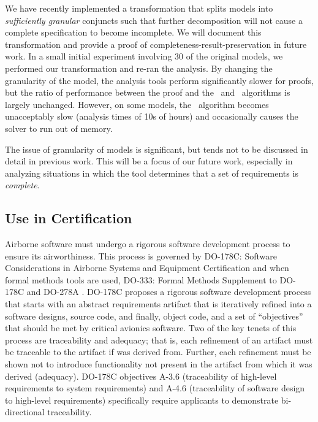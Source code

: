 %
We have recently implemented a transformation that splits models into {\em sufficiently granular} conjuncts such that further decomposition will not cause a complete specification to become incomplete.  We will document this transformation and provide a proof of completeness-result-preservation in future work.
%
In a small initial experiment involving 30 of the original models, we performed our transformation and re-ran the analysis.  By changing the granularity of the model, the analysis tools perform significantly slower for proofs, but the ratio of performance between the proof and the \ucalg\ and \mustalg\ algorithms is largely unchanged.  However, on some models, the \mustalg\ algorithm becomes unacceptably slow (analysis times of 10s of hours) and occasionally causes the solver to run out of memory.

The issue of granularity of models is significant, but tends not to be discussed in detail in previous work.  This will be a focus of our future work, especially in analyzing situations in which the tool determines that a set of requirements is {\em complete}.

\subsection{Use in Certification}
Airborne software must undergo a rigorous software development process to ensure its airworthiness. This process is governed by DO-178C: Software Considerations in Airborne Systems and Equipment Certification \cite{DO178C} and when formal methods tools are used, DO-333: Formal Methods Supplement to DO-178C and DO-278A \cite{DO333}. DO-178C proposes a rigorous software development process that starts with an abstract requirements artifact that is iteratively refined into a software designs, source code, and finally, object code, and a set of ``objectives'' that should be met by critical avionics software.  Two of the key tenets of this process are traceability and adequacy; that is, each refinement of an artifact must be traceable to the artifact if was derived from. Further, each refinement must be shown not to introduce functionality not present in the artifact from which it was derived (adequacy).  DO-178C objectives A-3.6 (traceability of high-level requirements to system requirements) and A-4.6 (traceability of software design to high-level requirements) specifically require applicants to demonstrate bi-directional traceability.

